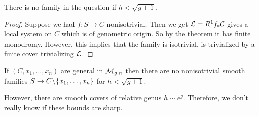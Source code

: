 \documentclass[12pt]{article}
\begin{document}
\begin{theorem}[L-Litt]
There is no family in the question if $h < \sqrt{g+1}$. 
\end{theorem}

\begin{proof}
Suppose we had $f : S \to C$ nonisotrivial. Then we get $\mathcal{L} = R^1 f_* \mathcal{C}$ gives a local system on $C$ which is of genometric origin. So by the theorem it has finite monodromy. However, this implies that the family is isotrivial, is trivialized by a finite cover trivializing $\mathcal{L}$.
\end{proof}

\begin{thm}
If $(C, x_1, \dots, x_n)$ are general in $\mathcal{M}_{g,n}$ then there are no nonisotrivial smooth families $S \to C \! \setminus \! \{ x_1, \dots, x_n\}$ for $h < \sqrt{g+1}$.
\end{thm}

\begin{rmk}
However, there are smooth covers of relative genus $h \sim e^g$. Therefore, we don't really know if these bounds are sharp. 
\end{rmk}
\end{document}
